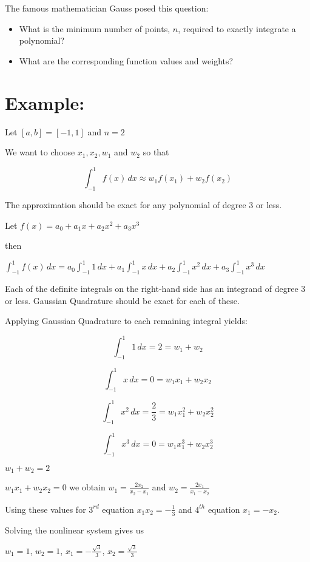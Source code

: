 \documentclass[11pt]{article}
\begin{document}
The famous mathematician Gauss posed this question:

\begin{itemize}
\item
  What is the minimum number of points, \(n\), required to exactly
  integrate a polynomial?
\item
  What are the corresponding function values and weights?
\end{itemize}

    \section{Example:}\label{example}

Let \([a, b] = [-1, 1]\) and \(n=2\)

We want to choose \(x_1, x_2, w_1\) and \(w_2\) so that

\[     \int_{-1}^1 f(x)\,dx \approx w_1 f(x_1) + w_2 f(x_2)\]

The approximation should be exact for any polynomial of degree 3 or
less.

    Let \(f(x) = a_0 + a_1x+a_2x^2+a_3x^3\)

then

\(\int_{-1}^1 f(x)\,dx = a_0\int_{-1}^1 1\,dx+a_1\int_{-1}^1 x\,dx+a_2\int_{-1}^1 x^2\,dx+a_3\int_{-1}^1 x^3\,dx\)

Each of the definite integrals on the right-hand side has an integrand
of degree 3 or less. Gaussian Quadrature should be exact for each of
these.

    Applying Gaussian Quadrature to each remaining integral yields:

\[\int_{-1}^1 1\,dx = 2 = w_1 + w_2\]

\[\int_{-1}^1 x \,dx = 0 = w_1 x_1 +w_2 x_2\]

\[\int_{-1}^1 x^2\,dx = \frac{2}{3} = w_1 x_1^2+w_2x_2^2\]

\[ \int_{-1}^1 x^3\,dx = 0 =w_1x_1^3 +w_2 x_2^3\]

    \(w_1 + w_2 = 2\)

\(w_1 x_1 +w_2 x_2 = 0\) we obtain \(w_1 = \frac{2x_2}{x_2-x_1}\) and
\(w_2 = \frac{2x_1}{x_1-x_2}\)

Using these values for \(3^{rd}\) equation \(x_1 x_2 =-\frac{1}{3}\) and
\(4^{th}\) equation \(x_1 = -x_2\).

    Solving the nonlinear system gives us

\(w_1 =1\), \(w_2=1\), \(x_1 = - \frac{\sqrt 3}{3}\),
\(x_2 = \frac{\sqrt 3}{3}\)
\end{document}
